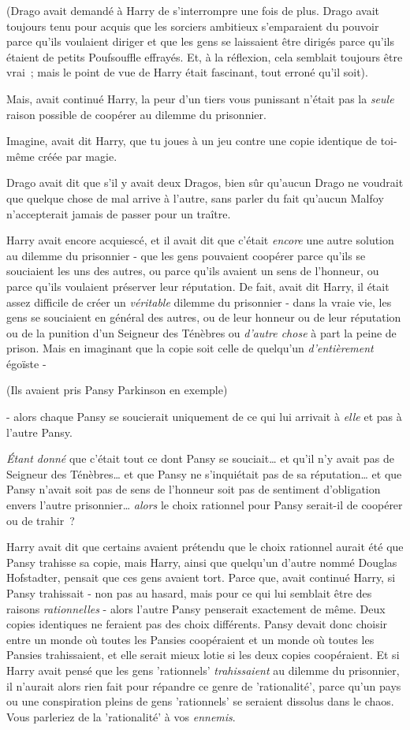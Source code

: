 (Drago avait demandé à Harry de s'interrompre une fois de plus. Drago avait toujours tenu pour acquis que les sorciers ambitieux s'emparaient du pouvoir parce qu'ils voulaient diriger et que les gens se laissaient être dirigés parce qu'ils étaient de petits Poufsouffle effrayés. Et, à la réflexion, cela semblait toujours être vrai~; mais le point de vue de Harry était fascinant, tout erroné qu'il soit).

Mais, avait continué Harry, la peur d'un tiers vous punissant n'était pas la \emph{seule} raison possible de coopérer au dilemme du prisonnier.

Imagine, avait dit Harry, que tu joues à un jeu contre une copie identique de toi-même créée par magie.

Drago avait dit que s'il y avait deux Dragos, bien sûr qu'aucun Drago ne voudrait que quelque chose de mal arrive à l'autre, sans parler du fait qu'aucun Malfoy n'accepterait jamais de passer pour un traître.

Harry avait encore acquiescé, et il avait dit que c'était \emph{encore} une autre solution au dilemme du prisonnier - que les gens pouvaient coopérer parce qu'ils se souciaient les uns des autres, ou parce qu'ils avaient un sens de l'honneur, ou parce qu'ils voulaient préserver leur réputation. De fait, avait dit Harry, il était assez difficile de créer un \emph{véritable} dilemme du prisonnier - dans la vraie vie, les gens se souciaient en général des autres, ou de leur honneur ou de leur réputation ou de la punition d'un Seigneur des Ténèbres ou \emph{d'autre chose} à part la peine de prison. Mais en imaginant que la copie soit celle de quelqu'un \emph{d'entièrement} égoïste -

(Ils avaient pris Pansy Parkinson en exemple)

- alors chaque Pansy se soucierait uniquement de ce qui lui arrivait à \emph{elle} et pas à l'autre Pansy.

\emph{Étant donné} que c'était tout ce dont Pansy se souciait… et qu'il n'y avait pas de Seigneur des Ténèbres… et que Pansy ne s'inquiétait pas de sa réputation… et que Pansy n'avait soit pas de sens de l'honneur soit pas de sentiment d'obligation envers l'autre prisonnier… \emph{alors} le choix rationnel pour Pansy serait-il de coopérer ou de trahir~?

Harry avait dit que certains avaient prétendu que le choix rationnel aurait été que Pansy trahisse sa copie, mais Harry, ainsi que quelqu'un d'autre nommé Douglas Hofstadter, pensait que ces gens avaient tort. Parce que, avait continué Harry, si Pansy trahissait - non pas au hasard, mais pour ce qui lui semblait être des raisons \emph{rationnelles} - alors l'autre Pansy penserait exactement de même. Deux copies identiques ne feraient pas des choix différents. Pansy devait donc choisir entre un monde où toutes les Pansies coopéraient et un monde où toutes les Pansies trahissaient, et elle serait mieux lotie si les deux copies coopéraient. Et si Harry avait pensé que les gens 'rationnels' \emph{trahissaient} au dilemme du prisonnier, il n'aurait alors rien fait pour répandre ce genre de 'rationalité', parce qu'un pays ou une conspiration pleins de gens 'rationnels' se seraient dissolus dans le chaos. Vous parleriez de la 'rationalité' à vos \emph{ennemis}.

